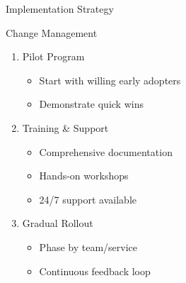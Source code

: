 \documentclass[presentation,aspectratio=169]{beamer}
\begin{document}
\begin{frame}[label={sec:org7f9d670},fragile]{Implementation Strategy}
\begin{block}{Change Management}
\begin{enumerate}[<+->]
\item \alert{Pilot Program}
\begin{itemize}
\item Start with willing early adopters
\item Demonstrate quick wins
\end{itemize}

\item \alert{Training \& Support}
\begin{itemize}
\item Comprehensive documentation
\item Hands-on workshops
\item 24/7 support available
\end{itemize}

\item \alert{Gradual Rollout}
\begin{itemize}
\item Phase by team/service
\item Continuous feedback loop
\end{itemize}
\end{enumerate}
\end{block}
\end{frame}
\end{document}
